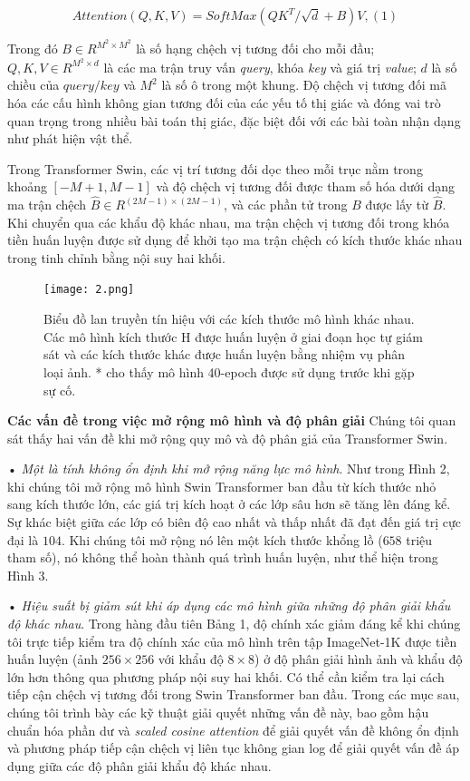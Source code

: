 \documentclass[times, twocolumn]{zHenriquesLab-StyleBioRxiv}
\begin{document}
$$Attention(Q, K, V) = SoftMax(QK^{T} /\sqrt{d} + B)V, (1)$$

Trong đó $B \in R^{M^{2} \times M^{2}}$ là số hạng chệch vị tương đối cho mỗi đầu; $Q, K, V \in R^{M^{2} \times d}$ là các ma trận truy vấn \textit{query}, khóa \textit{key} và giá trị \textit{value}; $d$ là số chiều của $query/key$ và $M^{2}$ là số ô trong một khung. Độ chệch vị tương đối mã hóa các cấu hình không gian tương đối của các yếu tố thị giác và đóng vai trò quan trọng trong nhiều bài toán thị giác, đặc biệt đối với các bài toàn nhận dạng như phát hiện vật thể.

Trong Transformer Swin, các vị trí tương đối dọc theo mỗi trục nằm trong khoảng $[−M + 1, M - 1]$ và độ chệch vị tương đối được tham số hóa dưới dạng ma trận chệch $\hat{B} \in R^{(2M − 1) \times (2M − 1)}$, và các phần tử trong $B$ được lấy từ $\hat{B}$. Khi chuyển qua các khẩu độ khác nhau, ma trận chệch vị tương đối trong khóa tiền huấn luyện được sử dụng để khởi tạo ma trận chệch có kích thước khác nhau trong tinh chỉnh bằng nội suy hai khối.


\begin{figure}[!ht] %
    \centering
    \texttt{[image: 2.png]}
    \caption{Biểu đồ lan truyền tín hiệu với các kích thước mô hình khác nhau. Các mô hình kích thước H được huấn luyện ở giai đoạn học tự giám sát và các kích thước khác được huấn luyện bằng nhiệm vụ phân loại ảnh. * cho thấy mô hình 40-epoch được sử dụng trước khi gặp sự cố.}
\end{figure}

\vspace*{5mm}
\textbf{Các vấn đề trong việc mở rộng mô hình và độ phân giải} Chúng tôi quan sát thấy hai vấn đề khi mở rộng quy mô và độ phân giả của Transformer Swin.

\vspace*{2mm}
• \textit{Một là tính không ổn định khi mở rộng năng lực mô hình}. Như trong Hình 2, khi chúng tôi mở rộng mô hình Swin Transformer ban đầu từ kích thước nhỏ sang kích thước lớn, các giá trị kích hoạt ở các lớp sâu hơn sẽ tăng lên đáng kể. Sự khác biệt giữa các lớp có biên độ cao nhất và thấp nhất đã đạt đến giá trị cực đại là $104$. Khi chúng tôi mở rộng nó lên một kích thước khổng lồ ($658$ triệu tham số), nó không thể hoàn thành quá trình huấn luyện, như thể hiện trong Hình 3.

\vspace*{2mm}
• \textit{Hiệu suất bị giảm sút khi áp dụng các mô hình giữa những độ phân giải khẩu độ khác nhau}. Trong hàng đầu tiên Bảng 1, độ chính xác giảm đáng kể khi chúng tôi trực tiếp kiểm tra độ chính xác của mô hình trên tập ImageNet-1K được tiền huấn luyện (ảnh $256 \times 256$ với khẩu độ $8 \times 8$) ở độ phân giải hình ảnh và khẩu độ lớn hơn thông qua phương pháp nội suy hai khối. Có thể cần kiểm tra lại cách tiếp cận chệch vị tương đối trong Swin Transformer ban đầu.
Trong các mục sau, chúng tôi trình bày các kỹ thuật giải quyết những vấn đề này, bao gồm hậu chuẩn hóa phần dư và \textit{scaled cosine attention} để giải quyết vấn đề không ổn định và phương pháp tiếp cận chệch vị liên tục không gian log để giải quyết vấn đề áp dụng giữa các độ phân giải khẩu độ khác nhau.
\end{document}
